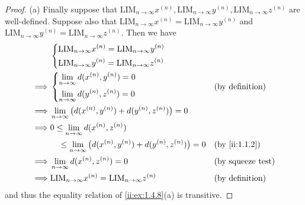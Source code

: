 \begin{proof}{(a)}
  Finally suppose that \(\text{LIM}_{n \to \infty} x^{(n)}, \text{LIM}_{n \to \infty} y^{(n)}, \text{LIM}_{n \to \infty} z^{(n)}\) are well-defined.
  Suppose also that \(\text{LIM}_{n \to \infty} x^{(n)} = \text{LIM}_{n \to \infty} y^{(n)}\) and \(\text{LIM}_{n \to \infty} y^{(n)} = \text{LIM}_{n \to \infty} z^{(n)}\).
  Then we have
  \begin{align*}
             & \begin{dcases}
                 \text{LIM}_{n \to \infty} x^{(n)} = \text{LIM}_{n \to \infty} y^{(n)} \\
                 \text{LIM}_{n \to \infty} y^{(n)} = \text{LIM}_{n \to \infty} z^{(n)}
               \end{dcases}                                                \\
    \implies & \begin{dcases}
                 \lim_{n \to \infty} d(x^{(n)}, y^{(n)}) = 0 \\
                 \lim_{n \to \infty} d(y^{(n)}, z^{(n)}) = 0
               \end{dcases}                                         &  & \text{(by definition)}                                     \\
    \implies & \lim_{n \to \infty} \big(d(x^{(n)}, y^{(n)}) + d(y^{(n)}, z^{(n)})\big) = 0                                          \\
    \implies & 0 \leq \lim_{n \to \infty} d(x^{(n)}, z^{(n)})                                                                       \\
             & \quad \leq \lim_{n \to \infty} \big(d(x^{(n)}, y^{(n)}) + d(y^{(n)}, z^{(n)})\big) = 0 &  & \by{ii:1.1.2}               \\
    \implies & \lim_{n \to \infty} d(x^{(n)}, z^{(n)}) = 0                                            &  & \text{(by squeeze test)} \\
    \implies & \text{LIM}_{n \to \infty} x^{(n)} = \text{LIM}_{n \to \infty} z^{(n)}                  &  & \text{(by definition)}
  \end{align*}
  and thus the equality relation of \cref{ii:ex:1.4.8}(a) is transitive.
\end{proof}

